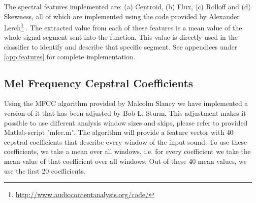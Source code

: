 The spectral features implemented are: (a) Centroid, (b) Flux, (c) Rolloff and (d) Skewness, all of which are implemented using the code provided by Alexander Lerch\footnote{\url{http://www.audiocontentanalysis.org/code/}} \citep{ACA}. The extracted value from each of these features is a mean value of the whole signal segment sent into the function. This value is directly used in the classifier to identify and describe that specific segment. See appendices under \ref{app:features} for complete implementation.

\subsection{Mel Frequency Cepstral Coefficients}
Using the MFCC algorithm provided by Malcolm Slaney we have implemented a version of it that has been adjusted by Bob L. Sturm. This adjustment makes it possible to use different analysis window sizes and skips, please refer to provided Matlab-script "mfcc.m". The algorithm will provide a feature vector with 40 cepstral coefficients that describe every window of the input sound. To use these coefficients, we take a mean over all windows, i.e. for every coefficient we take the mean value of that coefficient over all windows. Out of these 40 mean values, we use the first 20 coefficients.